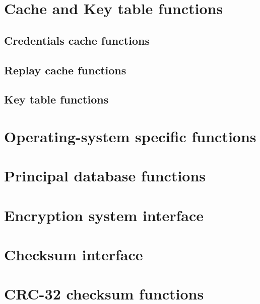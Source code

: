 \ifdraft\sloppy\fi

\section{Cache and Key table functions}

\subsection{Credentials cache functions}


\subsection{Replay cache functions}


\subsection{Key table functions}


\section{Operating-system specific functions}


\section{Principal database functions}



\section{Encryption system interface}


\section{Checksum interface}


\section{CRC-32 checksum functions}


\appendix
\cleardoublepage


